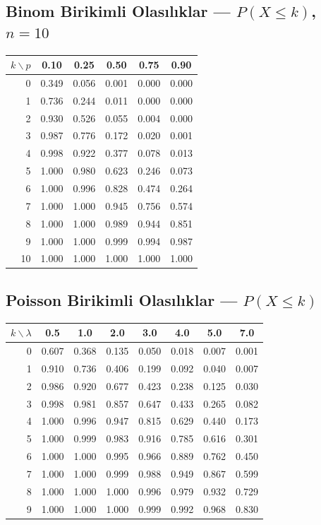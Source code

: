 \subsection{Binom Birikimli Olasılıklar --- $P(X\leq k)$, $n=10$}

\begin{center}
\small
\renewcommand{\arraystretch}{1.1}
\begin{tabular}{r|ccccc}
\hline
$k \backslash p$ & 0.10 & 0.25 & 0.50 & 0.75 & 0.90 \\
\hline
0 & 0.349 & 0.056 & 0.001 & 0.000 & 0.000 \\
1 & 0.736 & 0.244 & 0.011 & 0.000 & 0.000 \\
2 & 0.930 & 0.526 & 0.055 & 0.004 & 0.000 \\
3 & 0.987 & 0.776 & 0.172 & 0.020 & 0.001 \\
4 & 0.998 & 0.922 & 0.377 & 0.078 & 0.013 \\
5 & 1.000 & 0.980 & 0.623 & 0.246 & 0.073 \\
6 & 1.000 & 0.996 & 0.828 & 0.474 & 0.264 \\
7 & 1.000 & 1.000 & 0.945 & 0.756 & 0.574 \\
8 & 1.000 & 1.000 & 0.989 & 0.944 & 0.851 \\
9 & 1.000 & 1.000 & 0.999 & 0.994 & 0.987 \\
10 & 1.000 & 1.000 & 1.000 & 1.000 & 1.000 \\
\hline
\end{tabular}
\end{center}

\subsection{Poisson Birikimli Olasılıklar --- $P(X\leq k)$}

\begin{center}
\small
\renewcommand{\arraystretch}{1.1}
\begin{tabular}{r|ccccccc}
\hline
$k \backslash \lambda$ & 0.5 & 1.0 & 2.0 & 3.0 & 4.0 & 5.0 & 7.0 \\
\hline
0 & 0.607 & 0.368 & 0.135 & 0.050 & 0.018 & 0.007 & 0.001 \\
1 & 0.910 & 0.736 & 0.406 & 0.199 & 0.092 & 0.040 & 0.007 \\
2 & 0.986 & 0.920 & 0.677 & 0.423 & 0.238 & 0.125 & 0.030 \\
3 & 0.998 & 0.981 & 0.857 & 0.647 & 0.433 & 0.265 & 0.082 \\
4 & 1.000 & 0.996 & 0.947 & 0.815 & 0.629 & 0.440 & 0.173 \\
5 & 1.000 & 0.999 & 0.983 & 0.916 & 0.785 & 0.616 & 0.301 \\
6 & 1.000 & 1.000 & 0.995 & 0.966 & 0.889 & 0.762 & 0.450 \\
7 & 1.000 & 1.000 & 0.999 & 0.988 & 0.949 & 0.867 & 0.599 \\
8 & 1.000 & 1.000 & 1.000 & 0.996 & 0.979 & 0.932 & 0.729 \\
9 & 1.000 & 1.000 & 1.000 & 0.999 & 0.992 & 0.968 & 0.830 \\
\hline
\end{tabular}
\end{center}
